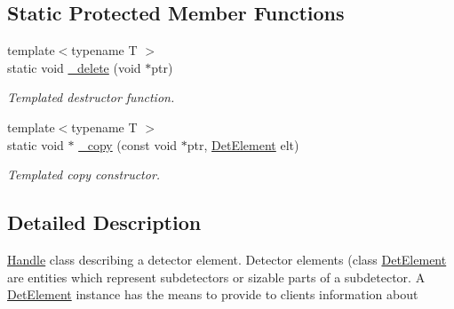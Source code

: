 \subsection*{Static Protected Member Functions}
\begin{DoxyCompactItemize}
\item 
{\footnotesize template$<$typename T $>$ }\\static void \hyperlink{class_d_d4hep_1_1_geometry_1_1_det_element_ab665e62a12e41f53be9193dda76e5e3a}{\_\-delete} (void $\ast$ptr)
\begin{DoxyCompactList}\small\item\em Templated destructor function. \item\end{DoxyCompactList}\item 
{\footnotesize template$<$typename T $>$ }\\static void $\ast$ \hyperlink{class_d_d4hep_1_1_geometry_1_1_det_element_ae801dc42d4da36cac2d1ad0f37ecd97b}{\_\-copy} (const void $\ast$ptr, \hyperlink{class_d_d4hep_1_1_geometry_1_1_det_element}{DetElement} elt)
\begin{DoxyCompactList}\small\item\em Templated copy constructor. \item\end{DoxyCompactList}\end{DoxyCompactItemize}


\subsection{Detailed Description}
\hyperlink{class_d_d4hep_1_1_handle}{Handle} class describing a detector element. Detector elements (class \hyperlink{class_d_d4hep_1_1_geometry_1_1_det_element}{DetElement} are entities which represent subdetectors or sizable parts of a subdetector. A \hyperlink{class_d_d4hep_1_1_geometry_1_1_det_element}{DetElement} instance has the means to provide to clients information about


